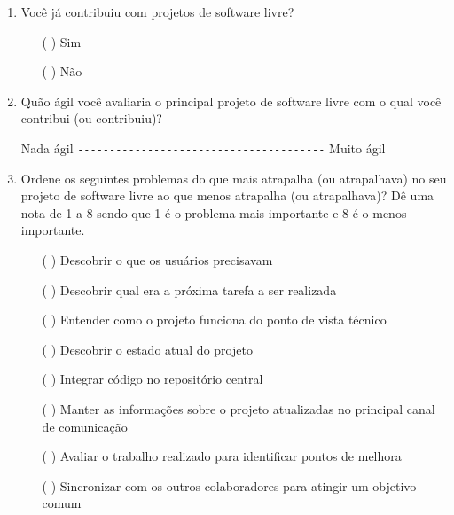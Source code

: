 \begin{enumerate}
\item Você já contribuiu com projetos de software livre?
  \begin{itemize}
  \item[( )] Sim
  \item[( )] Não
  \end{itemize}

\item Quão ágil você avaliaria o principal projeto de software livre
  com o qual você contribui (ou contribuiu)?

  Nada ágil \verb=---------------------------------------= Muito ágil

\item Ordene os seguintes problemas do que mais atrapalha (ou
  atrapalhava) no seu projeto de software livre ao que menos atrapalha
  (ou atrapalhava)? Dê uma nota de 1 a 8 sendo que 1 é o problema mais
  importante e 8 é o menos importante.
  \begin{itemize}
  \item[( )] Descobrir o que os usuários precisavam
  \item[( )] Descobrir qual era a próxima tarefa a ser realizada
  \item[( )] Entender como o projeto funciona do ponto de vista
    técnico
  \item[( )] Descobrir o estado atual do projeto
  \item[( )] Integrar código no repositório central
  \item[( )] Manter as informações sobre o projeto atualizadas no
    principal canal de comunicação
  \item[( )] Avaliar o trabalho realizado para identificar pontos de
    melhora
  \item[( )] Sincronizar com os outros colaboradores para atingir um
    objetivo comum
  \end{itemize}


\end{enumerate}

